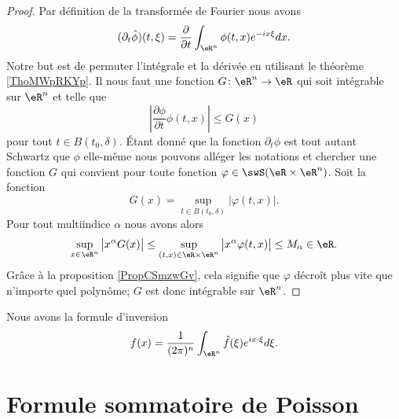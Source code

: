 \begin{proof}
    Par définition de la transformée de Fourier nous avons
    \begin{equation}
        (\partial_t\hat\phi)(t,\xi)=\frac{ \partial  }{ \partial t }\int_{\eR^n}\phi(t,x) e^{-i x\xi}dx.
    \end{equation}
    Notre but est de permuter l'intégrale et la dérivée en utilisant le théorème \ref{ThoMWpRKYp}. Il nous faut une fonction \( G\colon \eR^n\to \eR\) qui soit intégrable sur \( \eR^n\) et telle que
    \begin{equation}
        \left| \frac{ \partial \phi }{ \partial t }\phi(t,x) \right| \leq G(x)
    \end{equation}
    pour tout \( t\in B(t_0,\delta)\). Étant donné que la fonction \( \partial_t\phi\) est tout autant Schwartz que \( \phi\) elle-même nous pouvons alléger les notations et chercher une fonction \( G\) qui convient pour toute fonction \( \varphi\in\swS(\eR\times \eR^n)\). Soit la fonction
    \begin{equation}
        G(x)=\sup_{t\in B(t_0,\delta)}| \varphi(t,x) |.
    \end{equation}
    Pour tout multiindice \( \alpha\) nous avons alors
    \begin{equation}
        \sup_{x\in \eR^n}\big| x^{\alpha}G(x) \big|\leq \sup_{(t,x)\in \eR\times \eR^n}\big| x^{\alpha}\varphi(t,x) \big|\leq M_{\alpha}\in \eR.
    \end{equation}
    Grâce à la proposition \ref{PropCSmzwGv}, cela signifie que \( \varphi\) décroît plus vite que n'importe quel polynôme; \( G\) est donc intégrable sur \( \eR^n\).
\end{proof}

\begin{theorem}
    Nous avons la formule d'inversion
    \begin{equation}
        f(x)=\frac{1}{ (2\pi)^n }\int_{\eR^n}\hat f(\xi) e^{ix\cdot \xi}d\xi.
    \end{equation}
\end{theorem}


\section{Formule sommatoire de Poisson}

